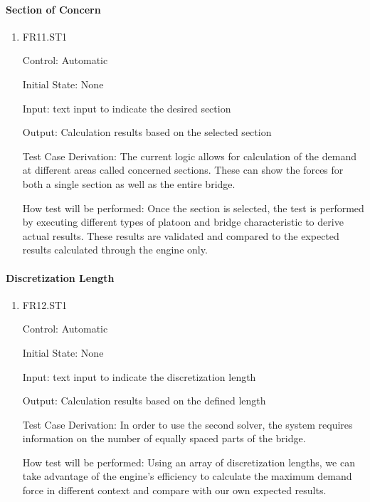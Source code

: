 \documentclass[12pt, titlepage]{article}
\begin{document}
\paragraph{Section of Concern}

\begin{enumerate}

  \item{FR11.ST1\\}

  Control: Automatic
            
  Initial State: None
            
  Input: text input to indicate the desired section 
            
  Output: Calculation results based on the selected section

  Test Case Derivation: The current logic allows for calculation of the demand at different areas called concerned sections. These can show the forces for both a single section as well as the entire bridge. 

  How test will be performed: Once the section is selected, the test is performed by executing different types of platoon and bridge characteristic to derive actual results. These results are validated and compared to the expected results calculated through the engine only. 
					
\end{enumerate}

\paragraph{Discretization Length}

\begin{enumerate}

  \item{FR12.ST1\\}

Control: Automatic
					
Initial State: None
					
Input: text input to indicate the discretization length 
					
Output: Calculation results based on the defined length

Test Case Derivation: In order to use the second solver, the system requires information on the number of equally spaced parts of the bridge. 

How test will be performed: Using an array of discretization lengths, we can take advantage of the engine's efficiency to calculate the maximum demand force in different context and compare with our own expected results. 

\end{enumerate}
\end{document}
